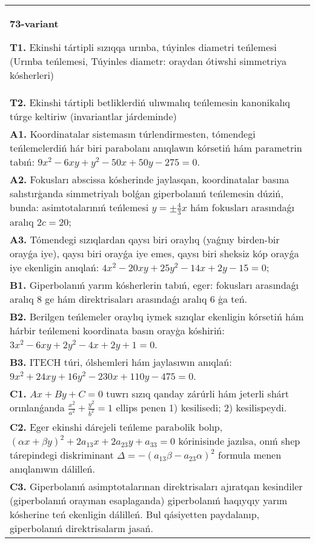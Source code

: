 \documentclass{article}
\begin{document}
\begin{tabular}{m{17cm}}
\textbf{73-variant}
\newline

\textbf{T1.} Ekinshi tártipli sızıqqa urınba, túyinles diametri teńlemesi (Urınba teńlemesi, Túyinles diametr: oraydan ótiwshi simmetriya kósherleri) \\
\textbf{T2.} Ekinshi tártipli betliklerdiń ulıwmalıq teńlemesin kanonikalıq túrge keltiriw (invariantlar járdeminde) \\
\textbf{A1.} Koordinatalar sistemasın túrlendirmesten, tómendegi teńlemelerdiń hár biri parabolanı anıqlawın kórsetiń hám parametrin tabıń: $9 x^2-6 x y+y^2-50 x+50 y-275=0$. \\
\textbf{A2.} Fokusları abscissa kósherinde jaylasqan, koordinatalar basına salıstırģanda simmetriyalı bolǵan giperbolanıń teńlemesin dúziń, bunda: asimtotalarınıń teńlemesi $y= \pm \frac{4}{3} x$ hám fokusları arasındaǵı aralıq $2 c=20$; \\
\textbf{A3.} Tómendegi sızıqlardan qaysı biri oraylıq (yaǵnıy birden-bir orayǵa iye), qaysı biri orayǵa iye emes, qaysı biri sheksiz kóp orayǵa iye ekenligin anıqlań: $4 x^2-20 x y+25 y^2-14 x+2 y-15=0$; \\
\textbf{B1.} Giperbolanıń yarım kósherlerin tabıń, eger: fokusları arasındaǵı aralıq 8 ge hám direktrisaları arasındaǵı aralıq 6 ģa teń. \\
\textbf{B2.} Berilgen teńlemeler oraylıq iymek sızıqlar ekenligin kórsetiń hám hárbir teńlemeni koordinata basın orayģa kóshiriń: $3x^2-6xy+2y^2-4x+2y+1=0$. \\
\textbf{B3.} ITECH túri, ólshemleri hám jaylasıwın anıqlań: $9 x^2+24 x y+16 y^2-230 x+110 y-475=0$. \\
\textbf{C1.} $A x+B y+C=0$ tuwrı sızıq qanday zárúrli hám jeterli shárt orınlanǵanda $\frac{x^2}{a^2}+\frac{y^2}{b^2}=1$ ellips penen 1) kesilisedi; 2) kesilispeydi. \\
\textbf{C2.} Eger ekinshi dárejeli teńleme parabolik bolıp, $ (\alpha x+\beta y) ^2+2a_{13}x+2a_{23}y+a_{33}=0$ kórinisinde jazılsa, onıń shep tárepindegi diskriminant $\Delta=- (a_{13} \beta-a_{23} \alpha) ^2$ formula menen anıqlanıwın dálilleń. \\
\textbf{C3.} Giperbolanıń asimptotalarınan direktrisaları ajıratqan kesindiler (giperbolanıń orayınan esaplaganda) giperbolanıń haqıyqıy yarım kósherine teń ekenligin dálilleń. Bul qásiyetten paydalanıp, giperbolanıń direktrisaların jasań. \\

\end{tabular}
\vspace{1cm}
\end{document}

